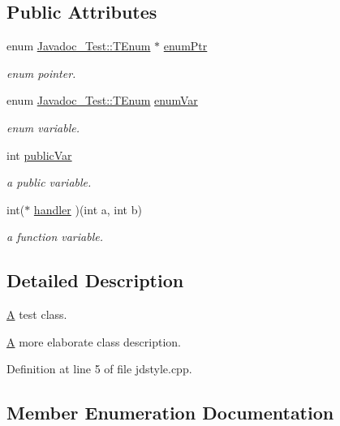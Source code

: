 \subsection*{Public Attributes}
\begin{DoxyCompactItemize}
\item 
enum \mbox{\hyperlink{class_javadoc___test_ae37fd1cbf1af522674cbd33873b786a6}{Javadoc\+\_\+\+Test\+::\+T\+Enum}} $\ast$ \mbox{\hyperlink{class_javadoc___test_abcb36df9d8af3e69290c239ba483d6df}{enum\+Ptr}}
\begin{DoxyCompactList}\small\item\em enum pointer. \end{DoxyCompactList}\item 
enum \mbox{\hyperlink{class_javadoc___test_ae37fd1cbf1af522674cbd33873b786a6}{Javadoc\+\_\+\+Test\+::\+T\+Enum}} \mbox{\hyperlink{class_javadoc___test_a689558649150237b53a5c8ed89c996c2}{enum\+Var}}
\begin{DoxyCompactList}\small\item\em enum variable. \end{DoxyCompactList}\item 
int \mbox{\hyperlink{class_javadoc___test_a44a516fbc3a4865e2dcae34649c9df6a}{public\+Var}}
\begin{DoxyCompactList}\small\item\em a public variable. \end{DoxyCompactList}\item 
int($\ast$ \mbox{\hyperlink{class_javadoc___test_ace81a523a4eef44501a841a6d338832b}{handler}} )(int a, int b)
\begin{DoxyCompactList}\small\item\em a function variable. \end{DoxyCompactList}\end{DoxyCompactItemize}


\subsection{Detailed Description}
\mbox{\hyperlink{class_a}{A}} test class. 

\mbox{\hyperlink{class_a}{A}} more elaborate class description. 

Definition at line 5 of file jdstyle.\+cpp.



\subsection{Member Enumeration Documentation}
\mbox{\label{class_javadoc___test_ae37fd1cbf1af522674cbd33873b786a6}} 
